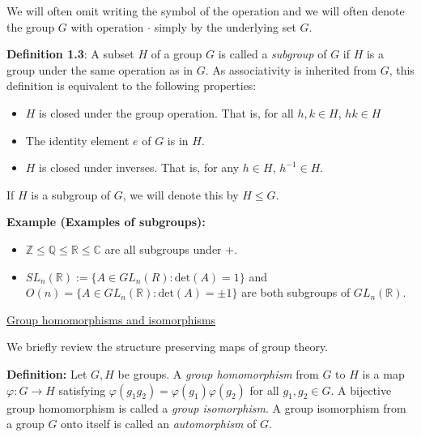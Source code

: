 \documentclass[12pt]{article}
\newcommand{\vs}{\vskip10pt}
\begin{document}
	\vs

	We will often omit writing the symbol of the operation and we will often denote the group $G$ with operation $\cdot$ simply by the underlying set $G$.
	
	\vs
	
	\textbf{Definition 1.3}: A subset $H$ of a group $G$ is called a \textit{subgroup} of $G$ if $H$ is a group under the same operation as in $G$. As associativity is inherited from $G$, this definition is equivalent to the following properties: 
	
	\begin{itemize}
		\item $H$ is closed under the group operation. That is, for all $h,k \in H$, $hk \in H$
		\item The identity element $e$ of $G$ is in $H$.
		\item $H$ is closed under inverses. That is, for any $h \in H$, $h^{-1} \in H$. 
	\end{itemize}

	\vs 
	
	If $H$ is a subgroup of $G$, we will denote this by $H \leq G$.
	
	\vs 
	
	\textbf{Example (Examples of subgroups): } 
	
	\begin{itemize}
		\item $\mathbb{Z} \leq \mathbb{Q} \leq \mathbb{R} \leq \mathbb{C}$ are all subgroups under +.
		\item $SL_n(\mathbb{R}) := \{A \in GL_n(R) : \text{det}(A) = 1\}$ and $O(n) = \{A \in GL_n(\mathbb{R}) : \text{det}(A) = \pm 1\}$ are both subgroups of $GL_n(\mathbb{R})$.
	\end{itemize}
	
	\vs 
	
	\underline{Group homomorphisms and isomorphisms}
	
	\vs
	
	We briefly review the structure preserving maps of group theory. 
	
	\vs
	
	\textbf{Definition: } Let $G,H$ be groups. A \textit{group homomorphism} from $G$ to $H$ is a map $\varphi: G \rightarrow H$ satisfying $\varphi(g_1g_2) = \varphi(g_1)\varphi(g_2)$ for all $g_1, g_2 \in G$. A bijective group homomorphism is called a \textit{group isomorphism}. A group isomorphism from a group $G$ onto itself is called an \textit{automorphism} of $G$.
	
\end{document}
